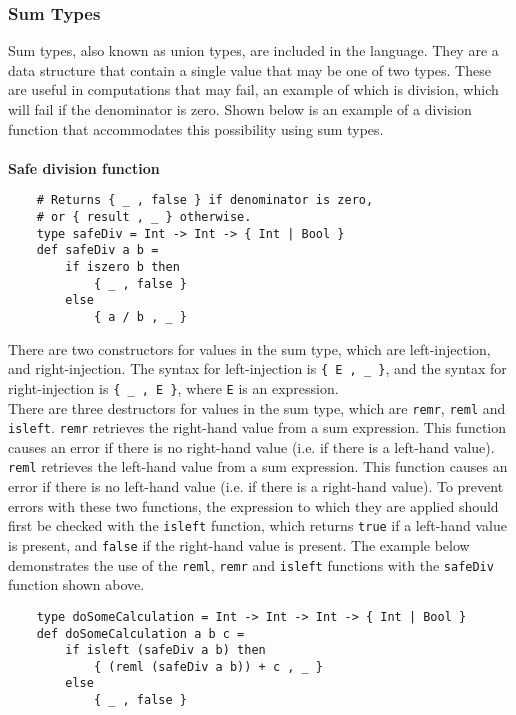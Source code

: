 \documentclass{article}
\begin{document}
\subsubsection{Sum Types}
Sum types, also known as union types, are included in the language. They are a data structure that contain a single value that may be one of two types. These are useful in computations that may fail, an example of which is division, which will fail if the denominator is zero. Shown below is an example of a division function that accommodates this possibility using sum types.
\\\\
\indent\textbf{Safe division function}
\begin{verbatim}
    # Returns { _ , false } if denominator is zero,
    # or { result , _ } otherwise.
    type safeDiv = Int -> Int -> { Int | Bool }
    def safeDiv a b =
        if iszero b then
            { _ , false }
        else
            { a / b , _ }
\end{verbatim}
There are two constructors for values in the sum type, which are left-injection, and right-injection. The syntax for left-injection is \texttt{\{ E , \_ \}}, and the syntax for right-injection is \texttt{\{ \_ , E \}}, where \texttt{E} is an expression.
\\\indent There are three destructors for values in the sum type, which are \texttt{remr}, \texttt{reml} and \texttt{isleft}. \texttt{remr} retrieves the right-hand value from a sum expression. This function causes an error if there is no right-hand value (i.e. if there is a left-hand value). \texttt{reml} retrieves the left-hand value from a sum expression. This function causes an error if there is no left-hand value (i.e. if there is a right-hand value). To prevent errors with these two functions, the expression to which they are applied should first be checked with the \texttt{isleft} function, which returns \texttt{true} if a left-hand value is present, and \texttt{false} if the right-hand value is present. The example below demonstrates the use of the \texttt{reml}, \texttt{remr} and \texttt{isleft} functions with the \texttt{safeDiv} function shown above.
\begin{verbatim}
    type doSomeCalculation = Int -> Int -> Int -> { Int | Bool }
    def doSomeCalculation a b c =
        if isleft (safeDiv a b) then
            { (reml (safeDiv a b)) + c , _ }
        else
            { _ , false }
\end{verbatim}
\end{document}
